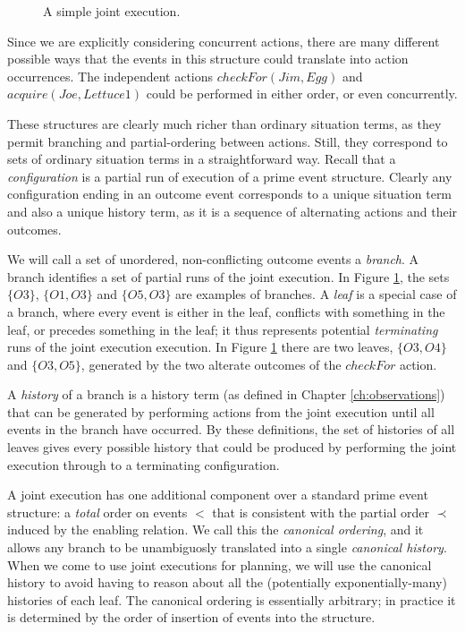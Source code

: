 %
\begin{figure}[t]

\caption{A simple joint execution.}


\label{fig:example-je} 
\end{figure}


Since we are explicitly considering concurrent actions, there are
many different possible ways that the events in this structure could
translate into action occurrences. The independent actions $checkFor(Jim,Egg)$
and $acquire(Joe,Lettuce1)$ could be performed in either order, or
even concurrently.

These structures are clearly much richer than ordinary situation terms,
as they permit branching and partial-ordering between actions. Still,
they correspond to sets of ordinary situation terms in a straightforward
way. Recall that a \emph{configuration} is a partial run of execution
of a prime event structure. Clearly any configuration ending in an
outcome event corresponds to a unique situation term and also a unique
history term, as it is a sequence of alternating actions and their
outcomes.

We will call a set of unordered, non-conflicting outcome events a
\emph{branch}. A branch identifies a set of partial runs of the joint
execution. In Figure \ref{fig:example-je}, the sets $\{O3\}$, $\{O1,O3\}$
and $\{O5,O3\}$ are examples of branches. A \emph{leaf} is a special
case of a branch, where every event is either in the leaf, conflicts
with something in the leaf, or precedes something in the leaf; it
thus represents potential \emph{terminating} runs of the joint execution
execution. In Figure \ref{fig:example-je} there are two leaves, $\{O3,O4\}$
and $\{O3,O5\}$, generated by the two alterate outcomes of the $checkFor$
action.

A \emph{history} of a branch is a history term (as defined in Chapter
\ref{ch:observations}) that can be generated by performing actions
from the joint execution until all events in the branch have occurred.
By these definitions, the set of histories of all leaves gives every
possible history that could be produced by performing the joint execution
through to a terminating configuration.

A joint execution has one additional component over a standard prime
event structure: a \emph{total} order on events $<$ that is consistent
with the partial order $\prec$ induced by the enabling relation.
We call this the \emph{canonical ordering}, and it allows any branch
to be unambiguosly translated into a single \emph{canonical history}.
When we come to use joint executions for planning, we will use the
canonical history to avoid having to reason about all the (potentially
exponentially-many) histories of each leaf. The canonical ordering
is essentially arbitrary; in practice it is determined by the order
of insertion of events into the structure.


